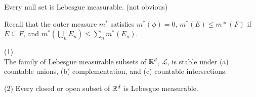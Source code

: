 \documentclass[a4paper]{article}
\begin{document}
\begin{rem}
Every null set is Lebesgue measurable. (not obvious)
\end{rem}

Recall that the outer measure $m^*$ satisfies $m^*(\phi)=0$, $m^*(E)\leq m*(F)$ if $E \subseteq F$, and $m^*(\bigcup_n E_n) \leq \sum_n m^*(E_n)$.

\begin{prop} (1)\\
The family of Lebesgue measurable subsets of $\mathbb{R}^d$, $\mathcal{L}$, is stable under (a) countable unions, (b) complementation, and (c) countable intersections.
\end{prop}

\begin{prop}(2)
Every closed or open subset of $\mathbb{R}^d$ is Lebesgue measurable.
\end{prop}
\end{document}
